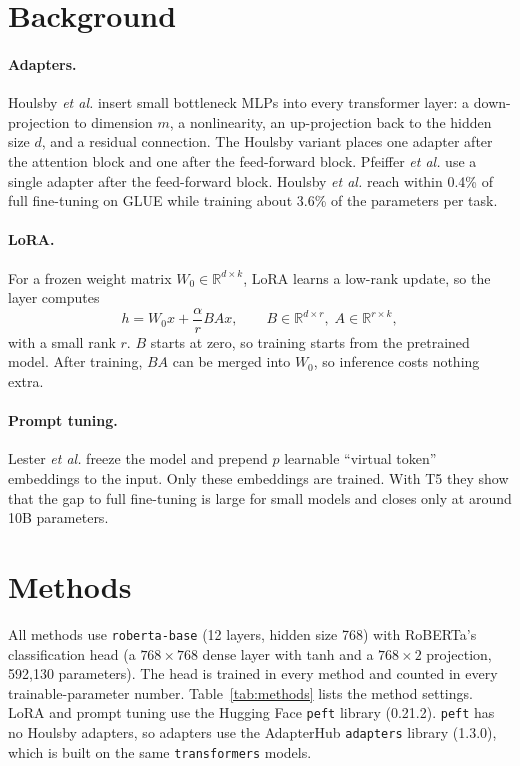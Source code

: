\documentclass{nle}
\begin{document}
\section{Background}

\paragraph{Adapters.} Houlsby {\it et al.}  insert small bottleneck MLPs into every transformer layer: a down-projection to dimension $m$, a nonlinearity, an up-projection back to the hidden size $d$, and a residual connection. The Houlsby variant places one adapter after the attention block and one after the feed-forward block. Pfeiffer {\it et al.}  use a single adapter after the feed-forward block. Houlsby {\it et al.} reach within 0.4\% of full fine-tuning on GLUE while training about 3.6\% of the parameters per task.

\paragraph{LoRA.} For a frozen weight matrix $W_0 \in \mathbb{R}^{d\times k}$, LoRA \cite{hu2022} learns a low-rank update, so the layer computes
\[ h = W_0x + \frac{\alpha}{r}BAx, \qquad B \in \mathbb{R}^{d\times r},\; A \in \mathbb{R}^{r\times k}, \]
with a small rank $r$. $B$ starts at zero, so training starts from the pretrained model. After training, $BA$ can be merged into $W_0$, so inference costs nothing extra.

\paragraph{Prompt tuning.} Lester {\it et al.}  freeze the model and prepend $p$ learnable ``virtual token'' embeddings to the input. Only these embeddings are trained. With T5 they show that the gap to full fine-tuning is large for small models and closes only at around 10B parameters.

\section{Methods}

All methods use \texttt{roberta-base} \cite{liu2019} (12 layers, hidden size 768) with RoBERTa's classification head (a $768{\times}768$ dense layer with tanh and a $768{\times}2$ projection, 592,130 parameters). The head is trained in every method and counted in every trainable-parameter number. Table~\ref{tab:methods} lists the method settings. LoRA and prompt tuning use the Hugging Face \texttt{peft} library (0.21.2). \texttt{peft} has no Houlsby adapters, so adapters use the AdapterHub \texttt{adapters} library (1.3.0), which is built on the same \texttt{transformers} models.
\end{document}
